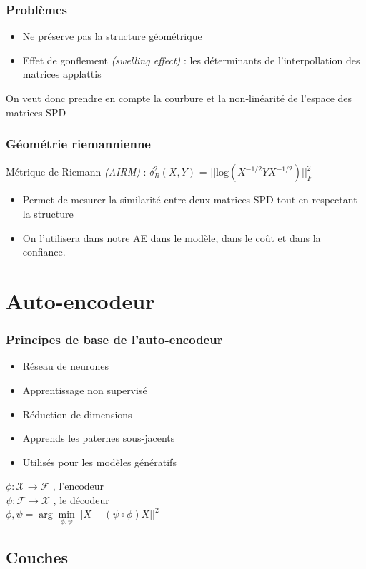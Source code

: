 \documentclass{beamer}
\begin{document}
\begin{frame}
\frametitle{Problèmes}
\begin{itemize}
\item Ne préserve pas la structure géométrique
\item Effet de gonflement \textit{(swelling effect)} : les déterminants de l'interpollation des matrices applattis
\end{itemize}
On veut donc prendre en compte la courbure et la non-linéarité de l'espace des matrices SPD
\end{frame}
\begin{frame}
\frametitle{Géométrie riemannienne}
Métrique de Riemann \textit{(AIRM)} : $\delta^2_R(X,Y)$ = $||\text{log}(X^{-1/2}YX^{-1/2})||^2_F$
\begin{itemize}
\item Permet de mesurer la similarité entre deux matrices SPD tout en respectant la structure
\item On l'utilisera dans notre AE dans le modèle, dans le coût et dans la confiance.
\end{itemize}
\end{frame}
\section{Auto-encodeur}
\begin{frame}
\frametitle{Principes de base de l'auto-encodeur}
\begin{itemize}
    \item Réseau de neurones
    \item Apprentissage non supervisé
    \item Réduction de dimensions
    \item Apprends les paternes sous-jacents
    \item Utilisés pour les modèles génératifs
\end{itemize}
\begin{center}
    $ \phi : \mathcal{X} \rightarrow \mathcal{F}$ , l'encodeur \\
    $ \psi : \mathcal{F} \rightarrow \mathcal{X}$ , le décodeur \\
    $ \phi,\psi = \arg \min\limits_{\phi,\psi} || X-(\psi \circ \phi)X||^2$
\end{center}

\end{frame}

\subsection{Couches}
\end{document}

